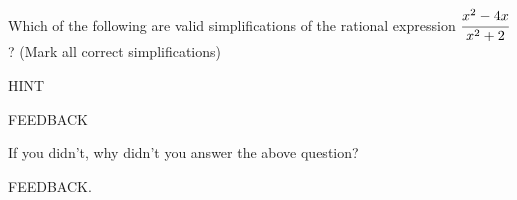 \documentclass{ximera}
\begin{document}
\begin{problem} 
\begin{problem}
    Which of the following are valid simplifications of the rational expression $\cfrac{x^2 - 4x}{x^2 + 2}$? (Mark all correct simplifications)
    
    \begin{hint}
    HINT
    \end{hint}

  \begin{selectAll}
      
      \begin{feedback}[attempt]
      FEEDBACK
      \end{feedback}
  \end{selectAll}
\end{problem}
\begin{question}

    If you didn't, why didn't you answer the above question?
    
    \begin{multipleChoice}
      
          \begin{feedback}[attempt]
          FEEDBACK.
          \end{feedback}
    \end{multipleChoice}
\end{question}
\end{problem}
\end{document}
